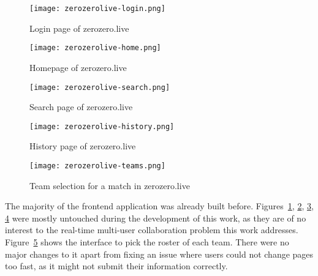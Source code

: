 \begin{figure}[ht]
    \begin{center}
        \leavevmode
        \texttt{[image: zerozerolive-login.png]}
        \caption{Login page of zerozero.live}
        \label{fig:zerozerolive-login}
    \end{center}
\end{figure}

\begin{figure}[ht]
    \begin{center}
        \leavevmode
        \texttt{[image: zerozerolive-home.png]}
        \caption{Homepage of zerozero.live}
        \label{fig:zerozerolive-home}
    \end{center}
\end{figure}

\begin{figure}[ht]
    \begin{center}
        \leavevmode
        \texttt{[image: zerozerolive-search.png]}
        \caption{Search page of zerozero.live}
        \label{fig:zerozerolive-search}
    \end{center}
\end{figure}

\begin{figure}[ht]
    \begin{center}
        \leavevmode
        \texttt{[image: zerozerolive-history.png]}
        \caption{History page of zerozero.live}
        \label{fig:zerozerolive-history}
    \end{center}
\end{figure}

\begin{figure}[ht]
    \begin{center}
        \leavevmode
        \texttt{[image: zerozerolive-teams.png]}
        \caption{Team selection for a match in zerozero.live}
        \label{fig:zerozerolive-teams}
    \end{center}
\end{figure}

The majority of the frontend application was already built before. Figures~\ref{fig:zerozerolive-login}, \ref{fig:zerozerolive-home}, \ref{fig:zerozerolive-search}, \ref{fig:zerozerolive-history} were mostly untouched during the development of this work, as they are of no interest to the real-time multi-user collaboration problem this work addresses. Figure~\ref{fig:zerozerolive-teams} shows the interface to pick the roster of each team. There were no major changes to it apart from fixing an issue where users could not change pages too fast, as it might not submit their information correctly.

